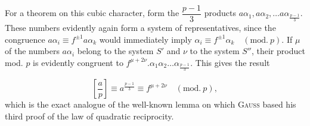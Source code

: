 For a theorem on this cubic character, form the
$\dfrac{p-1}{3}$ products $a\alpha_1, a\alpha_2, \ldots
a\alpha_{\frac{p-1}{3}}$. These numbers evidently again form a system of
representatives, since the congruence $a\alpha_i \equiv
f^{\pm1}a\alpha_k$ would immediately imply $\alpha_i \equiv f^{\pm1}\alpha_k \quad(\mathrm{mod.}\ p)$.
If $\mu$ of the numbers $a\alpha_i$ belong to the system $S'$ and $\nu$
to the system $S''$, their product mod. $p$ is evidently congruent to
$f^{\mu+2\nu}. \alpha_1\alpha_2\ldots\alpha_{\frac{p-1}{3}}$. This gives the result

\[
\left[\frac{a}{p}\right] \equiv a^{\frac{p-1}{3}} \equiv f^{\mu+2\nu} \quad(\mathrm{mod.}\ p),
\]
\noindent which is the exact analogue of the well-known lemma on which \textsc{Gauss}
based his third proof of the law of quadratic reciprocity.

